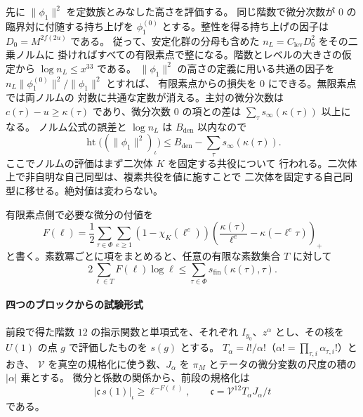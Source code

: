 先に \(\|\phi_1\|^2\) を定数族とみなした高さを評価する。
同じ階数で微分次数が \(0\) の臨界対に付随する持ち上げを
\(\phi^{(0)}_1\) とする。整性を得る持ち上げの因子は \(D_0=M^{2f(2u)}\) である。
従って、安定化群の分母も含めた \(n_L=C_{\mathrm{lev}}D_0^2\) をその二乗ノルムに
掛ければすべての有限素点で整になる。階数とレベルの大きさの仮定から \(\log n_L\le x^{33}\) である。
\(\|\phi_1\|^2\) の高さの定義に用いる共通の因子を
\(n_L\|\phi^{(0)}_1\|^2/\|\phi_1\|^2\) とすれば、
有限素点からの損失を \(0\) にできる。無限素点では両ノルムの
対数に共通な定数が消える。主対の微分次数は
\(c(\tau)-u\ge\kappa(\tau)\) であり、微分次数 \(0\) の項との差は
\(\sum_\tau s_\infty(\kappa(\tau))\) 以上になる。
ノルム公式の誤差と \(\log n_L\) は \(B_{\mathrm{den}}\) 以内なので
\begin{equation}
 \operatorname{ht}\big((\|\phi_1\|^2)_\iota\big)
  \le B_{\mathrm{den}}-\sum_{\tau} s_\infty(\kappa(\tau)).
 \label{eq:untwisted-rankone-height}
\end{equation}
ここでノルムの評価はまず二次体 \(K\) を固定する共役について
行われる。二次体上で非自明な自己同型は、複素共役を値に施すことで
二次体を固定する自己同型に移せる。絶対値は変わらない。

有限素点側で必要な微分の付値を
\[
 F(\ell)=\frac12\sum_{\tau\in\Phi}\sum_{e\ge 1}
     (1-\chi_K(\ell^e))
     \left(\frac{\kappa(\tau)}{\ell^e}-\kappa(-\ell^e\tau)\right)_+
\]
と書く。素数冪ごとに項をまとめると、任意の有限な素数集合 \(T\) に対して
\begin{equation}
 2\sum_{\ell\in T}F(\ell)\log\ell
   \le \sum_{\tau\in\Phi}s_{\mathrm{fin}}(\kappa(\tau),\tau).
 \label{eq:local-prime-total-lower}
\end{equation}





\paragraph{四つのブロックからの試験形式}
前段で得た階数 \(12\) の指示関数と単項式を、それぞれ \(I_{y_0}\)、\(z^\alpha\)
とし、その核を \(U(1)\) の点 \(g\) で評価したものを \(s(g)\) とする。
\(T_\alpha=l!/\alpha!\)（\(\alpha!=\prod_{\tau,i}\alpha_{\tau,i}!\)）とおき、
\(\mathcal V\) を真空の規格化に使う数、\(J_\alpha\) を
\(\pi_M\) とテータの微分変数の尺度の積の \(|\alpha|\) 乗とする。
微分と係数の関係から、前段の規格化は
\[
  |\mathfrak c\,s(1)|_\iota\ge\ell^{-F(\ell)},
  \qquad \mathfrak c=\mathcal V^{12}T_\alpha J_\alpha/t
\]
である。

